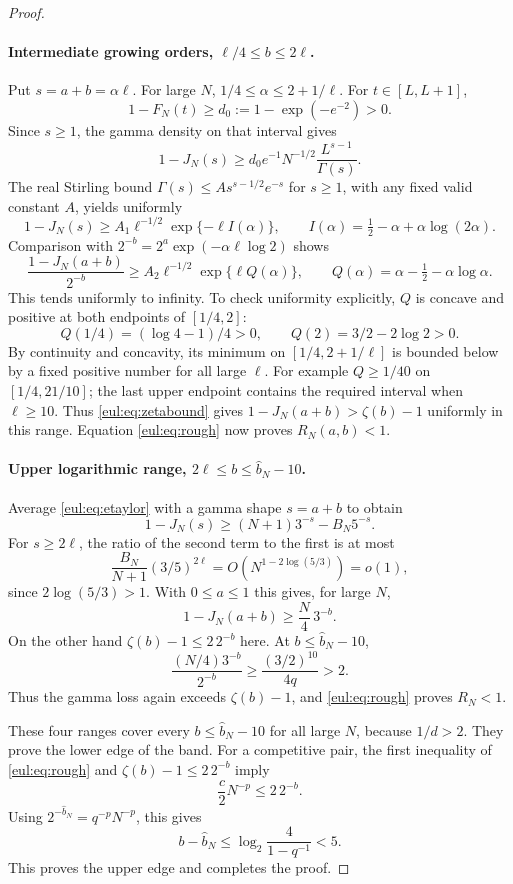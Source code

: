 \begin{proof}
\paragraph{Intermediate growing orders, $\ell/4\leq b\leq2\ell$.}
Put $s=a+b=\alpha\ell$.  For large $N$,
$1/4\leq\alpha\leq2+1/\ell$.  For $t\in[L,L+1]$,
\[
 1-F_N(t)\geq d_0:=1-\exp(-e^{-2})>0.
\]
Since $s\geq1$, the gamma density on that interval gives
\begin{equation}\label{eul:eq:tailwindow}
 1-J_N(s)\geq
 d_0e^{-1}N^{-1/2}\frac{L^{s-1}}{\Gamma(s)}.
\end{equation}
The real Stirling bound $\Gamma(s)\leq A s^{s-1/2}e^{-s}$ for
$s\geq1$, with any fixed valid constant $A$, yields uniformly
\[
 1-J_N(s)\geq A_1\ell^{-1/2}\exp\{-\ell I(\alpha)\},
 \qquad I(\alpha)=\tfrac12-\alpha+\alpha\log(2\alpha).
\]
Comparison with $2^{-b}=2^a\exp(-\alpha\ell\log2)$ shows
\[
 \frac{1-J_N(a+b)}{2^{-b}}
 \geq A_2\ell^{-1/2}\exp\{\ell Q(\alpha)\},
 \qquad Q(\alpha)=\alpha-\tfrac12-\alpha\log\alpha.
\]
This tends uniformly to infinity.  To check uniformity explicitly,
$Q$ is concave and positive at both endpoints of $[1/4,2]$:
\[
 Q(1/4)=(\log4-1)/4>0,\qquad Q(2)=3/2-2\log2>0.
\]
By continuity and concavity, its minimum on
$[1/4,2+1/\ell]$ is bounded below by a fixed positive number for all
large $\ell$.  For example $Q\geq1/40$ on $[1/4,21/10]$;
the last upper endpoint contains the required interval when $\ell\geq10$.
Thus \eqref{eul:eq:zetabound} gives
$1-J_N(a+b)>\zeta(b)-1$ uniformly in this range.  Equation
\eqref{eul:eq:rough} now proves $R_N(a,b)<1$.

\paragraph{Upper logarithmic range, $2\ell\leq b\leq\widehat b_N-10$.}
Average \eqref{eul:eq:etaylor} with a gamma shape $s=a+b$ to obtain
\[
 1-J_N(s)\geq(N+1)3^{-s}-B_N5^{-s}.
\]
For $s\geq2\ell$, the ratio of the second term to the first is at most
\[
 \frac{B_N}{N+1}(3/5)^{2\ell}
   =O\!\left(N^{1-2\log(5/3)}\right)=o(1),
\]
since $2\log(5/3)>1$.  With $0\leq a\leq1$ this gives, for large $N$,
\[
 1-J_N(a+b)\geq\frac N4\,3^{-b}.
\]
On the other hand $\zeta(b)-1\leq2\,2^{-b}$ here.  At
$b\leq\widehat b_N-10$,
\[
 \frac{(N/4)3^{-b}}{2^{-b}}
 \geq\frac{(3/2)^{10}}{4q}>2.
\]
Thus the gamma loss again exceeds $\zeta(b)-1$, and
\eqref{eul:eq:rough} proves $R_N<1$.

These four ranges cover every $b\leq\widehat b_N-10$ for all large
$N$, because $1/d>2$.  They prove the lower edge of the band.
For a competitive pair, the first inequality of \eqref{eul:eq:rough} and
$\zeta(b)-1\leq2\,2^{-b}$ imply
\[
 \frac c2N^{-p}\leq2\,2^{-b}.
\]
Using $2^{-\widehat b_N}=q^{-p}N^{-p}$, this gives
\[
 b-\widehat b_N\leq\log_2\frac4{1-q^{-1}}<5.
\]
This proves the upper edge and completes the proof.
\end{proof}

